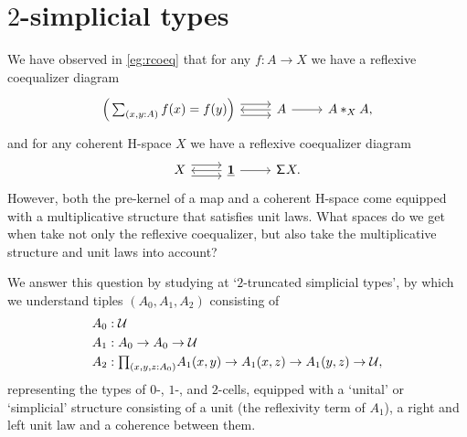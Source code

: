 \chapter{$2$-simplicial types}\label{chap:simplicial}

We have observed in \cref{eg:rcoeq} that for any $f:A\to X$ we have a reflexive coequalizer diagram
\begin{equation*}
\begin{tikzcd}
\Big(\sm{x,y:A}f(x)=f(y)\Big) \arrow[r,yshift=1ex] \arrow[r,yshift=-1ex] & A \arrow[l] \arrow[r] & \join[X]{A}{A},
\end{tikzcd}
\end{equation*}
and for any coherent H-space $X$ we have a reflexive coequalizer diagram
\begin{equation*}
\begin{tikzcd}
X \arrow[r,yshift=1ex] \arrow[r,yshift=-1ex] & \unit \arrow[l] \arrow[r] & \susp X.
\end{tikzcd}
\end{equation*}
However, both the pre-kernel of a map and a coherent H-space come equipped with a multiplicative structure that satisfies unit laws. What spaces do we get when take not only the reflexive coequalizer, but also take the multiplicative structure and unit laws into account?

We answer this question by studying at `$2$-truncated simplicial types', by which we understand tiples $(A_0,A_1,A_2)$ consisting of
\begin{align*}
A_0 & : \UU \\
A_1 & : A_0 \to A_0 \to \UU\\
A_2 & : \prd{x,y,z:A_0} A_1(x,y) \to A_1(x,z)\to A_1(y,z) \to \UU,
\end{align*}
representing the types of $0$-, $1$-, and $2$-cells, equipped with a `unital' or `simplicial' structure consisting of a unit (the reflexivity term of $A_1$), a right and left unit law and a coherence between them.

